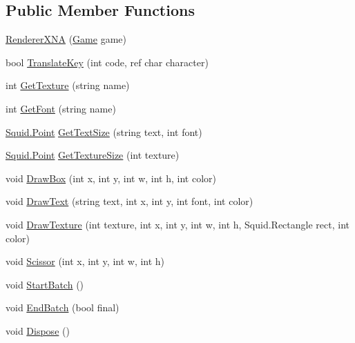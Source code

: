 \subsection*{Public Member Functions}
\begin{DoxyCompactItemize}
\item 
\hyperlink{class_squid_x_n_a_1_1_renderer_x_n_a_a71fdf88965a4c090f51dee7529326498}{Renderer\+X\+N\+A} (\hyperlink{class_squid_x_n_a_1_1_game}{Game} game)
\item 
bool \hyperlink{class_squid_x_n_a_1_1_renderer_x_n_a_acfb669e967e03a45739f5356456ba61a}{Translate\+Key} (int code, ref char character)
\item 
int \hyperlink{class_squid_x_n_a_1_1_renderer_x_n_a_a800647226c6d0cea3c2bd6af0b1f17fa}{Get\+Texture} (string name)
\item 
int \hyperlink{class_squid_x_n_a_1_1_renderer_x_n_a_a6214223cbee2d13ecbcd03960700feb1}{Get\+Font} (string name)
\item 
\hyperlink{_seidel_decomposer_8cs_a2a603daa342d957bd27dd0b1eb38af15}{Squid.\+Point} \hyperlink{class_squid_x_n_a_1_1_renderer_x_n_a_a1926b3c0450870c7ffcb728f776019e6}{Get\+Text\+Size} (string text, int font)
\item 
\hyperlink{_seidel_decomposer_8cs_a2a603daa342d957bd27dd0b1eb38af15}{Squid.\+Point} \hyperlink{class_squid_x_n_a_1_1_renderer_x_n_a_a3a60029b4781d76bd04bf4fe387549f3}{Get\+Texture\+Size} (int texture)
\item 
void \hyperlink{class_squid_x_n_a_1_1_renderer_x_n_a_aca1ac0d9c18d5203a26183a96b60bf93}{Draw\+Box} (int x, int y, int w, int h, int color)
\item 
void \hyperlink{class_squid_x_n_a_1_1_renderer_x_n_a_ae995c006bd789199b0e193178dbdae16}{Draw\+Text} (string text, int x, int y, int font, int color)
\item 
void \hyperlink{class_squid_x_n_a_1_1_renderer_x_n_a_ae5ba3402b915d8d4830a3c503a42b9d1}{Draw\+Texture} (int texture, int x, int y, int w, int h, Squid.\+Rectangle rect, int color)
\item 
void \hyperlink{class_squid_x_n_a_1_1_renderer_x_n_a_ac7ba04cae34a0cbb86118c2f013b26de}{Scissor} (int x, int y, int w, int h)
\item 
void \hyperlink{class_squid_x_n_a_1_1_renderer_x_n_a_aa49456bbde971e1d57d9e1a897d95175}{Start\+Batch} ()
\item 
void \hyperlink{class_squid_x_n_a_1_1_renderer_x_n_a_abded26fb1dbf3ee844191df22f2bd850}{End\+Batch} (bool final)
\item 
void \hyperlink{class_squid_x_n_a_1_1_renderer_x_n_a_a0567fc9bfa93b2977ee1c6308262e743}{Dispose} ()
\end{DoxyCompactItemize}
